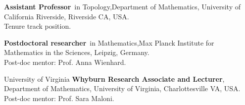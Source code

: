 
{\textbf{Assistant Professor}~in Topology,}{Department of Mathematics, University of California Riverside, Riverside CA, USA.\\ Tenure track position.}

\vspace{-1em}
{\textbf{Postdoctoral researcher}~in Mathematics,}{Max Planck Institute for Mathematics in the Sciences, Leipzig, Germany. \\ Post-doc mentor: Prof. Anna Wienhard.}

\vspace{-1em}
{University of Virginia}
{\textbf{Whyburn Research Associate and Lecturer},}
{Department of Mathematics, University of Virginia, Charlottesville VA, USA. \\
Post-doc mentor: Prof. Sara Maloni.}
